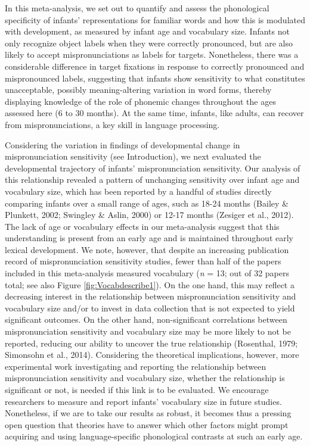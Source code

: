 \documentclass[
  english,
  man, noextraspace]{apa6}
\begin{document}
In this meta-analysis, we set out to quantify and assess the phonological specificity of infants' representations for familiar words and how this is modulated with development, as measured by infant age and vocabulary size. Infants not only recognize object labels when they were correctly pronounced, but are also likely to accept mispronunciations as labels for targets. Nonetheless, there was a considerable difference in target fixations in response to correctly pronounced and mispronounced labels, suggesting that infants show sensitivity to what constitutes unacceptable, possibly meaning-altering variation in word forms, thereby displaying knowledge of the role of phonemic changes throughout the ages assessed here (6 to 30 months). At the same time, infants, like adults, can recover from mispronunciations, a key skill in language processing.

Considering the variation in findings of developmental change in mispronunciation sensitivity (see Introduction), we next evaluated the developmental trajectory of infants' mispronunciation sensitivity. Our analysis of this relationship revealed a pattern of unchanging sensitivity over infant age and vocabulary size, which has been reported by a handful of studies directly comparing infants over a small range of ages, such as 18-24 months (Bailey \& Plunkett, 2002; Swingley \& Aslin, 2000) or 12-17 months (Zesiger et al., 2012). The lack of age or vocabulary effects in our meta-analysis suggest that this understanding is present from an early age and is maintained throughout early lexical development. We note, however, that despite an increasing publication record of mispronunciation sensitivity studies, fewer than half of the papers included in this meta-analysis measured vocabulary (\emph{n} = 13; out of 32 papers total; see also Figure \ref{fig:Vocabdescribe1}). On the one hand, this may reflect a decreasing interest in the relationship between mispronunciation sensitivity and vocabulary size and/or to invest in data collection that is not expected to yield significant outcomes. On the other hand, non-significant correlations between mispronunciation sensitivity and vocabulary size may be more likely to not be reported, reducing our ability to uncover the true relationship (Rosenthal, 1979; Simonsohn et al., 2014). Considering the theoretical implications, however, more experimental work investigating and reporting the relationship between mispronunciation sensitivity and vocabulary size, whether the relationship is significant or not, is needed if this link is to be evaluated. We encourage researchers to measure and report infants' vocabulary size in future studies. Nonetheless, if we are to take our results as robust, it becomes thus a pressing open question that theories have to answer which other factors might prompt acquiring and using language-specific phonological contrasts at such an early age.
\end{document}
